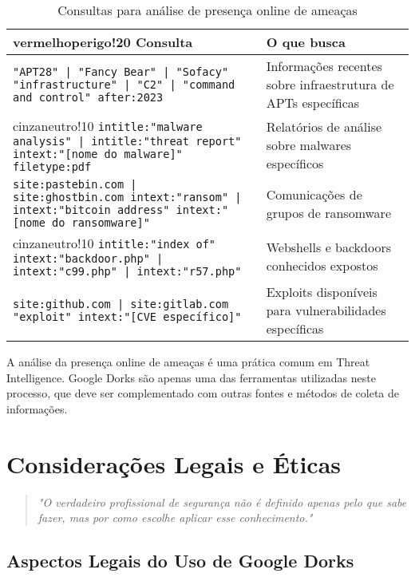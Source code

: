 \documentclass[12pt,a4paper]{book}
\begin{document}
\begin{table}[h]
\centering
\begin{tabular}{|p{8cm}|p{7cm}|}
\hline
{vermelhoperigo!20} \textbf{Consulta} & \textbf{O que busca} \\
\hline
\texttt{"APT28" | "Fancy Bear" | "Sofacy" "infrastructure" | "C2" | "command and control" after:2023} & Informações recentes sobre infraestrutura de APTs específicas \\
\hline
{cinzaneutro!10} \texttt{intitle:"malware analysis" | intitle:"threat report" intext:"[nome do malware]" filetype:pdf} & Relatórios de análise sobre malwares específicos \\
\hline
\texttt{site:pastebin.com | site:ghostbin.com intext:"ransom" | intext:"bitcoin address" intext:"[nome do ransomware]"} & Comunicações de grupos de ransomware \\
\hline
{cinzaneutro!10} \texttt{intitle:"index of" intext:"backdoor.php" | intext:"c99.php" | intext:"r57.php"} & Webshells e backdoors conhecidos expostos \\
\hline
\texttt{site:github.com | site:gitlab.com "exploit" intext:"[CVE específico]"} & Exploits disponíveis para vulnerabilidades específicas \\
\hline
\end{tabular}
\caption{Consultas para análise de presença online de ameaças}
\end{table}

\begin{notebox}
A análise da presença online de ameaças é uma prática comum em Threat Intelligence. Google Dorks são apenas uma das ferramentas utilizadas neste processo, que deve ser complementado com outras fontes e métodos de coleta de informações.
\end{notebox}

\chapter{Considerações Legais e Éticas}

\begin{quote}
\textit{"O verdadeiro profissional de segurança não é definido apenas pelo que sabe fazer, mas por como escolhe aplicar esse conhecimento."} \\
\end{quote}

\section{Aspectos Legais do Uso de Google Dorks}
\end{document}
